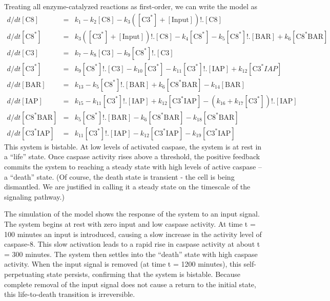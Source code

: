 \documentclass{beamer}
\newcommand{\beqn}{\begin{eqnarray*}}
\newcommand{\eeqn}{\end{eqnarray*}}
\newcommand{\tim}{} %
\begin{document}
Treating all enzyme-catalyzed reactions as first-order, we can write the model
as
\beqn
d/dt[\mbox{C8}]\tim &=& 
k_{1}- 
k_{2}[\mbox{C8}]\tim - 
k_{3}([\mbox{C3} ^* ]\tim +
[\mbox{Input}]\tim )!.[\mbox{C8}]\tim 
\\
d/dt[\mbox{C8} ^* ]\tim &=&
k_{3}([\mbox{C3} ^* ]\tim +
[\mbox{Input}]\tim )!.[\mbox{C8}]\tim - 
k_{4}[\mbox{C8} ^* ]\tim - 
k_{5}[\mbox{C8} ^* ]\tim !.[\mbox{BAR}]\tim +
k_{6}[\mbox{C8} ^* \mbox{BAR}]\tim  
\\
d/dt[\mbox{C3}]\tim &=& 
k_{7}- 
k_{8}[\mbox{C3}]\tim - 
k_{9}[\mbox{C8} ^* ]\tim !.[\mbox{C3}]\tim 
\\
d/dt[\mbox{C3} ^* ]\tim &=&
k_{9}[\mbox{C8} ^* ]\tim !.[\mbox{C3}]\tim - 
k_{10}[\mbox{C3} ^* ]\tim - 
k_{11}[\mbox{C3} ^* ]\tim !.[\mbox{IAP}]\tim +
k_{12}[\mbox{C3} ^* IAP]\tim 
\\
d/dt[\mbox{BAR}]\tim &=& k_{13}-
k_{5}[\mbox{C8} ^* ]\tim !.[\mbox{BAR}]\tim +
k_{6}[\mbox{C8} ^* \mbox{BAR}]\tim -
k_{14}[\mbox{BAR}]\tim 
\\
d/dt[\mbox{IAP}]\tim &=& k_{15}-
k_{11}[\mbox{C3} ^* ]\tim !.[\mbox{IAP}]\tim +
k_{12}[\mbox{C3} ^* \mbox{IAP}]\tim - 
(k_{16}+
k_{17}[\mbox{C3} ^* ]\tim )!.[\mbox{IAP}]\tim 
\\
d/dt[\mbox{C8} ^* \mbox{BAR}]\tim  &=& 
k_{5}[\mbox{C8} ^* ]\tim !.[\mbox{BAR}]\tim - 
k_{6}[\mbox{C8} ^* \mbox{BAR}]\tim- 
k_{18}[\mbox{C8} ^* \mbox{BAR}]\tim 
\\
d/dt[\mbox{C3} ^* \mbox{IAP}]\tim &=&
k_{11}[\mbox{C3} ^* ]\tim !.[\mbox{IAP}]\tim - 
k_{12}[\mbox{C3} ^* \mbox{IAP}]\tim - 
k_{19}[\mbox{C3} ^* \mbox{IAP}]\tim 
\eeqn
This system is bistable. At low levels of activated caspase, the system is at
rest in a ``life'' state.  Once caspase activity rises above a threshold, the
positive feedback commits the system to reaching a steady state with high
levels of active caspase -- a ``death'' state. (Of course, the death state is
transient - the cell is being dismantled. We are justified in calling it a
steady state on the timescale of the signaling pathway.)

The simulation of the model shows the response of the system
to an input signal.  The system begins at rest with zero input and low caspase
activity. At time t = 100 minutes an input is introduced, causing a slow
increase in the activity level of caspase-8. This slow activation leads to a
rapid rise in caspase activity at about t = 300 minutes. The system then
settles into the ``death'' state with high caspase activity. When the input
signal is removed (at time t = 1200 minutes), this self-perpetuating state
persists, confirming that the system is bistable. Because complete removal of
the input signal does not cause a return to the initial state, this
life-to-death transition is irreversible.
\end{document}
